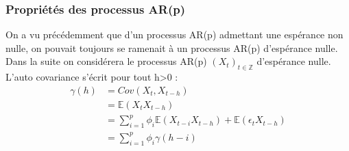 \documentclass[11pt]{scrartcl} %
\newcommand{\Xt}{\left(X_t\right)_{t\in\mathbb{Z}}}
\begin{document}
\subsubsection{Propriétés des processus AR(p)}
On a vu précédemment que d'un processus AR(p) admettant une espérance non nulle, on pouvait toujours se ramenait à un processus AR(p) d'espérance nulle. Dans la suite on considérera le processus AR(p) $\Xt$ d'espérance nulle. L'auto covariance s'écrit pour tout h>0 : 
\begin{align*}
\gamma(h)&= Cov(X_t,X_{t-h})\\
&= \mathbb{E}\left(X_tX_{t-h}\right)\\
&= \sum_{i=1}^p\phi_i\mathbb{E}\left(X_{t-i}X_{t-h}\right)+\mathbb{E}\left(\epsilon_tX_{t-h}\right)\\
&= \sum_{i=1}^p\phi_i\gamma(h-i)
\end{align*}
\end{document}
